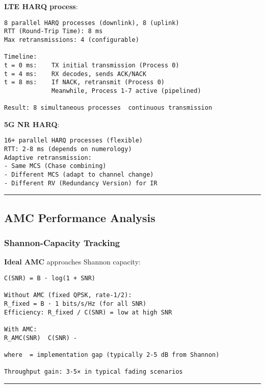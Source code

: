 \textbf{LTE HARQ process}:

\begin{verbatim}
8 parallel HARQ processes (downlink), 8 (uplink)
RTT (Round-Trip Time): 8 ms
Max retransmissions: 4 (configurable)

Timeline:
t = 0 ms:    TX initial transmission (Process 0)
t = 4 ms:    RX decodes, sends ACK/NACK
t = 8 ms:    If NACK, retransmit (Process 0)
             Meanwhile, Process 1-7 active (pipelined)

Result: 8 simultaneous processes  continuous transmission
\end{verbatim}

\textbf{5G NR HARQ}:

\begin{verbatim}
16+ parallel HARQ processes (flexible)
RTT: 2-8 ms (depends on numerology)
Adaptive retransmission:
- Same MCS (Chase combining)
- Different MCS (adapt to channel change)
- Different RV (Redundancy Version) for IR
\end{verbatim}

\begin{center}\rule{0.5\linewidth}{0.5pt}\end{center}

\subsection{AMC Performance Analysis}\label{amc-performance-analysis}

\subsubsection{Shannon-Capacity
Tracking}\label{shannon-capacity-tracking}

\textbf{Ideal AMC} approaches Shannon capacity:

\begin{verbatim}
C(SNR) = B · log(1 + SNR)

Without AMC (fixed QPSK, rate-1/2):
R_fixed = B · 1 bits/s/Hz (for all SNR)
Efficiency: R_fixed / C(SNR) = low at high SNR

With AMC:
R_AMC(SNR)  C(SNR) - 

where  = implementation gap (typically 2-5 dB from Shannon)

Throughput gain: 3-5× in typical fading scenarios
\end{verbatim}

\begin{center}\rule{0.5\linewidth}{0.5pt}\end{center}

